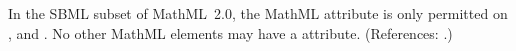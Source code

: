 In the SBML subset of MathML~2.0, the MathML attribute
 is only permitted on ,  and
.  No other MathML elements may have a
 attribute.  (References: .) 
